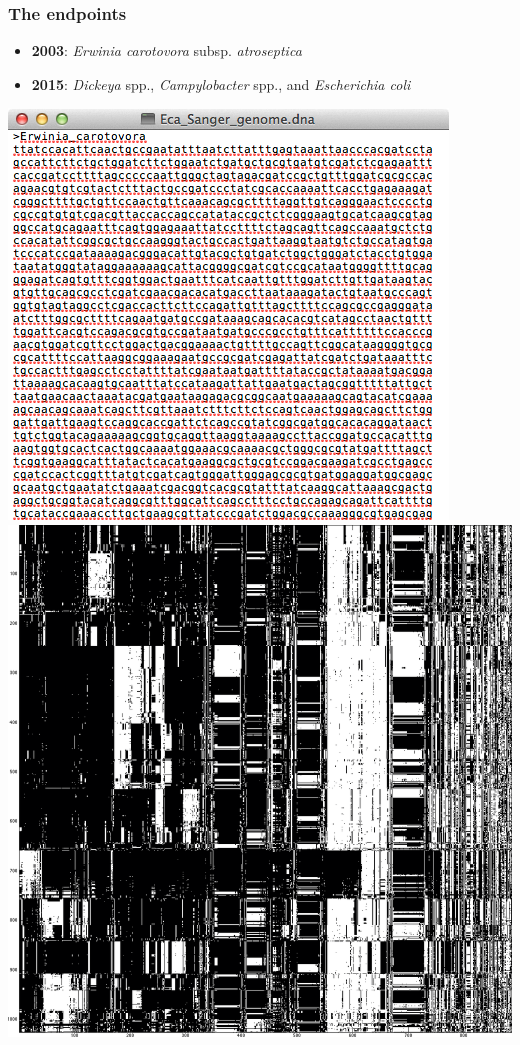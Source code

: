 \begin{frame}
  \frametitle{The endpoints}
  \begin{itemize}
    \item \textbf{2003}: \textit{Erwinia carotovora} subsp. \textit{atroseptica}
    \item \textbf{2015}: \textit{Dickeya} spp., \textit{Campylobacter} spp., and \textit{Escherichia coli}
  \end{itemize}
      \begin{center}
        \includegraphics[height=0.5\textheight]{images/pba_sequence}
        \includegraphics[width=0.5\textheight]{images/campy_presence_absence}
      \end{center}      
\end{frame}

